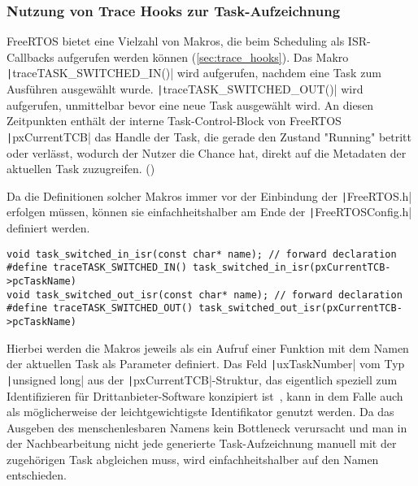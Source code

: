 \subsubsection{Nutzung von Trace Hooks zur Task-Aufzeichnung}

FreeRTOS bietet eine Vielzahl von Makros, die beim Scheduling als ISR-Callbacks
aufgerufen werden können (\ref{sec:trace_hooks}). Das Makro
\texttt|traceTASK_SWITCHED_IN()| wird aufgerufen, nachdem eine Task zum
Ausführen ausgewählt wurde. \texttt|traceTASK_SWITCHED_OUT()| wird
aufgerufen, unmittelbar bevor eine neue Task ausgewählt wird. An diesen
Zeitpunkten enthält der interne Task-Control-Block von FreeRTOS
\texttt|pxCurrentTCB| das Handle der Task, die gerade den Zustand
"Running" betritt oder verlässt, wodurch der Nutzer die Chance hat, direkt auf
die Metadaten der aktuellen Task zuzugreifen. (\cite{freertos_rtos_trace_hooks})

Da die Definitionen solcher Makros immer vor der Einbindung der
\texttt|FreeRTOS.h| erfolgen müssen, können sie einfachheitshalber
am Ende der \texttt|FreeRTOSConfig.h| definiert werden.

\begin{code}
\begin{verbatim}
void task_switched_in_isr(const char* name); // forward declaration
#define traceTASK_SWITCHED_IN() task_switched_in_isr(pxCurrentTCB->pcTaskName)
void task_switched_out_isr(const char* name); // forward declaration
#define traceTASK_SWITCHED_OUT() task_switched_out_isr(pxCurrentTCB->pcTaskName)
\end{verbatim}
\end{code}

Hierbei werden die Makros jeweils als ein Aufruf einer Funktion mit dem Namen
der aktuellen Task als Parameter definiert. Das Feld
\texttt|uxTaskNumber| vom Typ \texttt|unsigned long| aus der
\texttt|pxCurrentTCB|-Struktur, das eigentlich speziell zum
Identifizieren für Drittanbieter-Software konzipiert
ist~\cite{freertos_task_c_410}, kann in dem Falle auch als möglicherweise der
leichtgewichtigste Identifikator genutzt werden. Da das Ausgeben des
menschenlesbaren Namens kein Bottleneck verursacht und man in der
Nachbearbeitung nicht jede generierte Task-Aufzeichnung manuell mit der
zugehörigen Task abgleichen muss, wird einfachheitshalber auf den Namen
entschieden.
